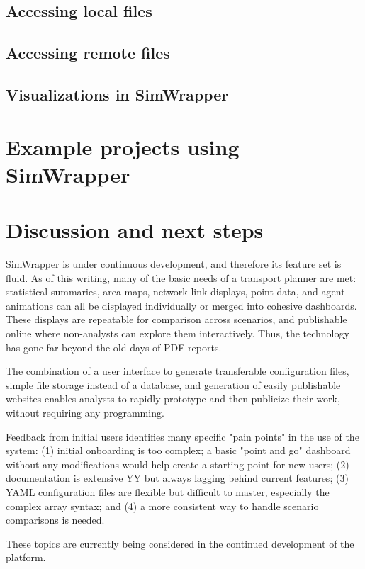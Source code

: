 \documentclass[3p,times,procedia]{elsarticle}
\begin{document}
\subsection{Accessing local files}
\subsection{Accessing remote files}
\subsection{Visualizations in SimWrapper}

\section{Example projects using SimWrapper}

\section{Discussion and next steps}

SimWrapper is under continuous development, and therefore its feature set is fluid. As of this writing, many of the basic needs of a transport planner are met: statistical summaries, area maps, network link displays, point data, and agent animations can all be displayed individually or merged into cohesive dashboards. These displays are repeatable for comparison across scenarios, and publishable online where non-analysts can explore them interactively. Thus, the technology has gone far beyond the old days of PDF reports.

The combination of a user interface to generate transferable configuration files, simple file storage instead of a database, and generation of easily publishable websites enables analysts to rapidly prototype and then publicize their work, without requiring any programming.

Feedback from initial users identifies many specific "pain points" in the use of the system: (1) initial onboarding is too complex; a basic "point and go" dashboard without any modifications would help create a starting point for new users; (2) documentation is extensive YY but always lagging behind current features; (3) YAML configuration files are flexible but difficult to master, especially the complex array syntax; and (4) a more consistent way to handle scenario comparisons is needed.

These topics are currently being considered in the continued development of the platform.
\end{document}
